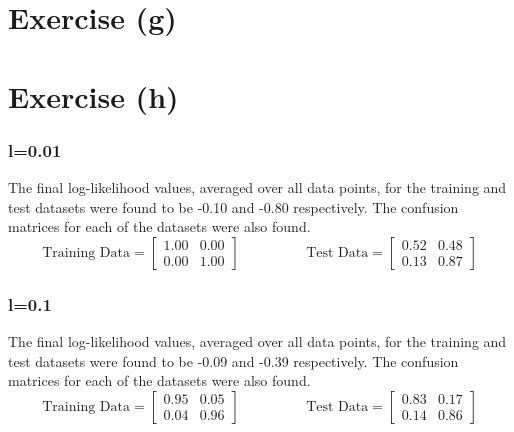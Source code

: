 \documentclass[12pt]{article}
\begin{document}
\section*{Exercise (g)}

\section*{Exercise (h)}

\subsubsection*{l=0.01}
The final log-likelihood values, averaged over all data points, for the training and test datasets were found to be -0.10 and -0.80 respectively. The confusion matrices for each of the datasets were also found. 
\begin{equation*}
  \text{Training Data} = 
  \begin{bmatrix}
    1.00 & 0.00  \\
    0.00 & 1.00 
  \end{bmatrix}
  \hspace{2cm}
  \text{Test Data} =
  \begin{bmatrix}
    0.52 & 0.48  \\
    0.13 & 0.87 
  \end{bmatrix}
\end{equation*}

\subsubsection*{l=0.1}
The final log-likelihood values, averaged over all data points, for the training and test datasets were found to be -0.09 and -0.39 respectively. The confusion matrices for each of the datasets were also found. 
\begin{equation*}
  \text{Training Data} = 
  \begin{bmatrix}
    0.95 & 0.05  \\
    0.04 & 0.96 
  \end{bmatrix}
  \hspace{2cm}
  \text{Test Data} =
  \begin{bmatrix}
    0.83 & 0.17  \\
    0.14 & 0.86 
  \end{bmatrix}
\end{equation*}
\end{document}
